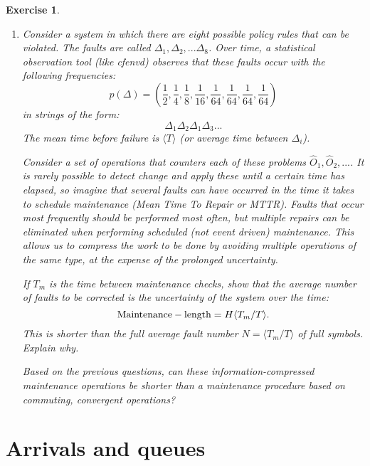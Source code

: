 \documentclass{book}
\newtheorem{exercise}{Exercise}
\begin{document}
\begin{exercise}
\begin{enumerate}
What is the total number of different messages one can create from
$C$ symbols
\begin{itemize}
\item If order matters?
\item If order and repetition  do not matter?
\end{itemize}

\item Consider a system in which there are eight possible policy rules that
can be violated. The faults are called $\Delta_1,\Delta_2,...\Delta_8$.
Over time, a statistical observation tool (like cfenvd) observes that
these faults occur with the following frequencies:
$$
p(\Delta) = \left(\frac{1}{2},\frac{1}{4},\frac{1}{8},\frac{1}{16},\frac{1}{64},\frac{1}{64},\frac{1}{64},\frac{1}{64} \right)
$$
in strings of the form:
$$
\Delta_1\Delta_2\Delta_1\Delta_3...
$$
The mean time before failure is $\langle T\rangle$ (or average time
between $\Delta_i$).

Consider a set of operations that counters each of these problems
$\hat O_1,\hat O_2, ...$. It is rarely possible to detect change and
apply these until a certain time has elapsed, so imagine that several
faults can have occurred in the time it takes to
schedule maintenance (Mean Time To Repair or MTTR). Faults that occur
most frequently should be performed most often, but multiple repairs
can be eliminated when performing scheduled (not event driven)
maintenance.  This allows us to compress the work to be done by
avoiding multiple operations of the same type, at the expense of the
prolonged uncertainty.

If $T_m$ is the time between maintenance checks, show that the average
number of faults to be corrected is the uncertainty of the system over
the time: $$ {\rm Maintenance-length} = H\langle T_m/T\rangle.  $$
This is shorter than the full average fault number $N =\langle
T_m/T\rangle$ of full symbols.  Explain why.

Based on the previous questions, can these information-compressed
maintenance operations be shorter than a maintenance procedure based
on commuting, convergent operations? 

\end{enumerate}
\end{exercise}
\begin{solution}
\end{solution}




\chapter{Arrivals and queues}
\end{document}
